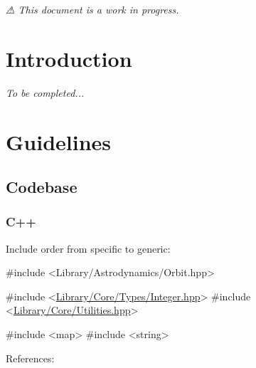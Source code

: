 {\itshape ⚠ This document is a work in progress.}\hypertarget{md__c_o_n_t_r_i_b_u_t_i_n_g_Introduction}{}\section{Introduction}\label{md__c_o_n_t_r_i_b_u_t_i_n_g_Introduction}
{\itshape To be completed...}\hypertarget{md__c_o_n_t_r_i_b_u_t_i_n_g_Guidelines}{}\section{Guidelines}\label{md__c_o_n_t_r_i_b_u_t_i_n_g_Guidelines}
\hypertarget{md__c_o_n_t_r_i_b_u_t_i_n_g_Codebase}{}\subsection{Codebase}\label{md__c_o_n_t_r_i_b_u_t_i_n_g_Codebase}
\hypertarget{md__c_o_n_t_r_i_b_u_t_i_n_g_C}{}\subsubsection{C++}\label{md__c_o_n_t_r_i_b_u_t_i_n_g_C}
Include order from specific to generic\+:


\begin{DoxyCode}
\textcolor{preprocessor}{#include <Library/Astrodynamics/Orbit.hpp>}

\textcolor{preprocessor}{#include <\hyperlink{_integer_8hpp}{Library/Core/Types/Integer.hpp}>}
\textcolor{preprocessor}{#include <\hyperlink{_utilities_8hpp}{Library/Core/Utilities.hpp}>}

\textcolor{preprocessor}{#include <map>}
\textcolor{preprocessor}{#include <string>}
\end{DoxyCode}


References\+:


